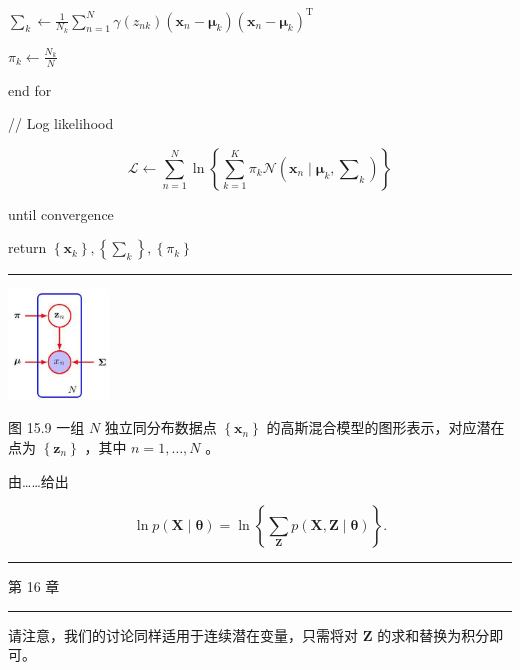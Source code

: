 \documentclass[10pt]{article}
\newcommand{\HRule}{\begin{center}\rule{0.9\linewidth}{0.2mm}\end{center}}
\begin{document}
\hspace*{3em} \({\mathbf{\sum }}_{k} \leftarrow  \frac{1}{{N}_{k}}\mathop{\sum }\limits_{{n = 1}}^{N}\gamma \left( {z}_{nk}\right) \left( {{\mathbf{x}}_{n} - {\mathbf{\mu }}_{k}}\right) {\left( {\mathbf{x}}_{n} - {\mathbf{\mu }}_{k}\right) }^{\mathrm{T}}\)

\hspace*{3em} \({\pi }_{k} \leftarrow  \frac{{N}_{k}}{N}\)

\hspace*{1em} end for

\hspace*{1em} // Log likelihood

\[
\mathcal{L} \leftarrow  \mathop{\sum }\limits_{{n = 1}}^{N}\ln \left\{  {\mathop{\sum }\limits_{{k = 1}}^{K}{\pi }_{k}\mathcal{N}\left( {{\mathbf{x}}_{n} \mid  {\mathbf{\mu }}_{k},{\mathbf{\sum }}_{k}}\right) }\right\}
\]

until convergence

return \(\left\{  {\mathbf{x}}_{k}\right\}  ,\left\{  {\mathbf{\sum }}_{k}\right\}  ,\left\{  {\pi }_{k}\right\}\)

\HRule

\begin{center}
\includegraphics[max width=0.2\textwidth]{images/0194e279-9b28-703a-88f4-c3ac21e2010d_495_1216_345_284_311_0.jpg}
\end{center}
\hspace*{3em} 

图 15.9 一组 \(N\) 独立同分布数据点 \(\left\{  {\mathbf{x}}_{n}\right\}\) 的高斯混合模型的图形表示，对应潜在点为 \(\left\{  {\mathbf{z}}_{n}\right\}\) ，其中 \(n = 1,\ldots ,N\) 。

由……给出

\[
\ln p\left( {\mathbf{X} \mid  \mathbf{\theta }}\right)  = \ln \left\{  {\mathop{\sum }\limits_{\mathbf{Z}}p\left( {\mathbf{X},\mathbf{Z} \mid  \mathbf{\theta }}\right) }\right\}  . \tag{15.22}
\]

\HRule

第 16 章

\HRule

请注意，我们的讨论同样适用于连续潜在变量，只需将对 \(\mathbf{Z}\) 的求和替换为积分即可。
\end{document}
